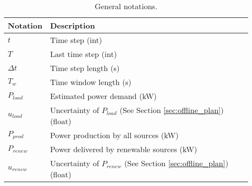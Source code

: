 \begin{table*}[!htb]
\centering
\caption{General notations.}
\label{tab:notation_system}
\begin{tabular}{l|l}
    \hline
    Notation & Description \\\hline\hline
    $t$ & Time step (int)\\
    $T$ & Last time step (int)\\
    $\Delta t$ & Time step length (s)\\
    $T_{w}$ & Time window length (s)\\
    $P_{load}$ & Estimated power demand (kW)\\
    $u_{load}$ & Uncertainty of $P_{load}$ (See Section \ref{sec:offline_plan}) (float)\\
    $P_{prod}$ & Power production by all sources (kW)\\
    $P_{renew}$ & Power delivered by renewable sources (kW)\\
    $u_{renew}$ & Uncertainty of $P_{renew}$ (See Section \ref{sec:offline_plan}) (float)\\
    \hline
\end{tabular}
\end{table*}